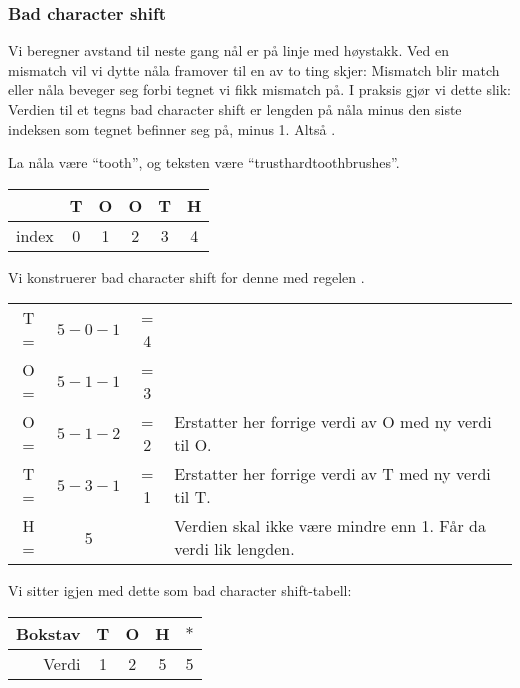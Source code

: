 	\subsubsection{Bad character shift}
		Vi beregner avstand til neste gang nål er på linje med høystakk.
		Ved en mismatch vil vi dytte nåla framover til en av to ting skjer: Mismatch blir match eller nåla beveger seg forbi tegnet vi fikk mismatch på.
		I praksis gjør vi dette slik: Verdien til et tegns bad character shift er lengden på nåla minus den siste indeksen som tegnet befinner seg på, minus 1. Altså .
		
		\begin{example}
		La nåla være ``tooth'', og teksten være ``trusthardtoothbrushes''.
		
		\begin{center}
			\begin{tabular}{r | c c c c c}
				& T & O & O & T & H \\ \hline
				index & 0 & 1 & 2 & 3 & 4
			\end{tabular}
		\end{center}

		\noindent Vi konstruerer bad character shift for denne med regelen .

\begin{center}
\begin{tabular}{cccl}
T = & $5-0-1$&= 4\\
O = & $5-1-1$&= 3\\
O = & $5-1-2$&= 2&Erstatter her forrige verdi av O med ny verdi til O.\\
T = &$5-3-1$& = 1&Erstatter her forrige verdi av T med ny verdi til T.\\
H = &5 &&Verdien skal ikke være mindre enn 1. Får da verdi lik lengden.\\
\end{tabular}
\end{center}
\noindent Vi sitter igjen med dette som bad character shift-tabell:
\begin{center}
\begin{tabular}{r|cccc}
Bokstav&T&O&H&$*$\\
\hline
Verdi&1&2&5&5\\
\end{tabular}
\end{center}


\end{example}
